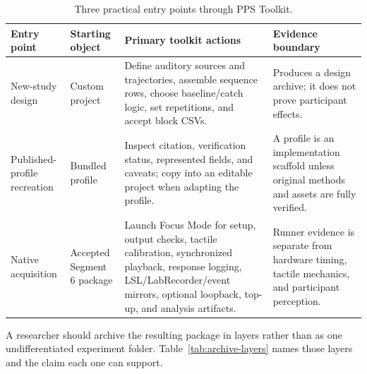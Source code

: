 \documentclass[pdflatex,sn-apa]{sn-jnl}
\begin{document}
\begin{table}[t]
\caption{Three practical entry points through PPS Toolkit.}
\label{tab:entrypoints}
\footnotesize
\begin{tabularx}{\textwidth}{>{\raggedright\arraybackslash}p{} >{\raggedright\arraybackslash}p{} >{\raggedright\arraybackslash}X >{\raggedright\arraybackslash}p{}}
\toprule
Entry point & Starting object & Primary toolkit actions & Evidence boundary \\
\midrule
New-study design & Custom project & Define auditory sources and trajectories, assemble sequence rows, choose baseline/catch logic, set repetitions, and accept block CSVs. & Produces a design archive; it does not prove participant effects. \\
Published-profile recreation & Bundled profile & Inspect citation, verification status, represented fields, and caveats; copy into an editable project when adapting the profile. & A profile is an implementation scaffold unless original methods and assets are fully verified. \\
Native acquisition & Accepted Segment 6 package & Launch Focus Mode for setup, output checks, tactile calibration, synchronized playback, response logging, LSL/LabRecorder/event mirrors, optional loopback, top-up, and analysis artifacts. & Runner evidence is separate from hardware timing, tactile mechanics, and participant perception. \\
\bottomrule
\end{tabularx}
\end{table}

A researcher should archive the resulting package in layers rather than as one undifferentiated experiment folder. Table~\ref{tab:archive-layers} names those layers and the claim each one can support.
\end{document}
